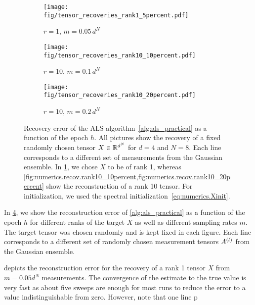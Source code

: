 \begin{figure*}
  \begin{subfigure}{.3 \columnwidth}
    \texttt{[image: fig/tensor\_recoveries\_rank1\_5percent.pdf]}
    \caption{%
      \label{fig:numerics.recov.rank1_5percent}%
      $r = 1$, $m = 0.05 \, d^N$
    }
  \end{subfigure}
  \begin{subfigure}{.3 \columnwidth}
    \texttt{[image: fig/tensor\_recoveries\_rank10\_10percent.pdf]}
    \caption{%
      \label{fig:numerics.recov.rank10_10percent}%
      $r = 10$, $m = 0.1 \, d^N$
    }
  \end{subfigure}
  \begin{subfigure}{.3 \columnwidth}
    \texttt{[image: fig/tensor\_recoveries\_rank10\_20percent.pdf]}
    \caption{%
      \label{fig:numerics.recov.rank10_20percent}%
      $r = 10$, $m = 0.2 \, d^N$
    }
  \end{subfigure}
  \caption{%
    \label{fig:numerics.recov}%
    Recovery error of the ALS algorithm~\ref{alg:als_practical} as a function of the epoch $h$.
    All pictures show the recovery of a fixed randomly chosen tensor $X \in {\mathbb{R}}^{d^N}$ for $d = 4$ and $N = 8$.
    Each line corresponds to a different set of measurements from the Gaussian ensemble.
    In \cref{fig:numerics.recov.rank1_5percent}, we chose $X$ to be of rank 1, whereas \cref{fig:numerics.recov.rank10_10percent,fig:numerics.recov.rank10_20percent} show the reconstruction of a rank 10 tensor.
    For initialization, we used the spectral initialization~\eqref{eq:numerics.Xinit}.
  }
\end{figure*}

In \cref{fig:numerics.recov}, we show the reconstruction error of \cref{alg:als_practical} as a function of the epoch $h$ for different ranks of the target $X$ as well as different sampling rates $m$.
The target tensor was chosen randomly and is kept fixed in each figure.
Each line corresponds to a different set of randomly chosen measurement tensors $A^{(l)}$ from the Gaussian ensemble.

 depicts the reconstruction error for the recovery of a rank 1 tensor $X$ from $m = 0.05 d^N$ measurements.
The convergence of the estimate to the true value is very fast as about five sweeps are enough for most runs to reduce the error to a value indistinguishable from zero.
However, note that one line p








